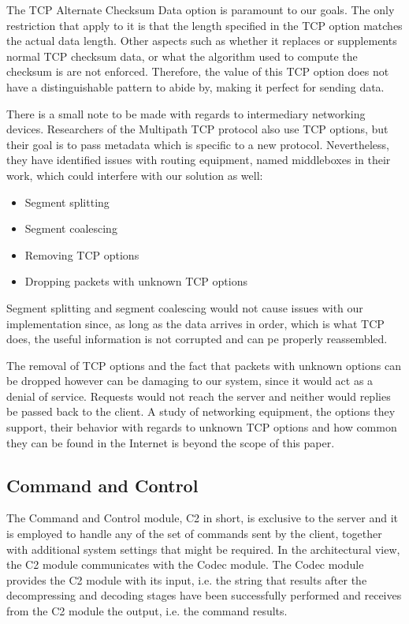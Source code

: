 The TCP Alternate Checksum Data option is paramount to our goals. The only
restriction that apply to it is that the length specified in the TCP option
matches the actual data length. Other aspects such as whether it replaces or
supplements normal TCP checksum data, or what the algorithm used to compute the
checksum is are not enforced. Therefore, the value of this TCP option does not
have a distinguishable pattern to abide by, making it perfect for sending data.

There is a small note to be made with regards to intermediary networking devices.
Researchers of the Multipath TCP protocol \cite{mptcp-how-hard} also use TCP options, but
their goal is to pass metadata which is specific to a new protocol. Nevertheless,
they have identified issues with routing equipment, named middleboxes in their work,
which could interfere with our solution as well:
\begin{itemize}
\item Segment splitting
\item Segment coalescing
\item Removing TCP options
\item Dropping packets with unknown TCP options
\end{itemize}

Segment splitting and segment coalescing would not cause issues with our implementation
since, as long as the data arrives in order, which is what TCP does, the useful
information is not corrupted and can pe properly reassembled.

The removal of TCP options and the fact that packets with unknown options can be
dropped however can be damaging to our system, since it would act as a denial of
service. Requests would not reach the server and neither would replies be passed
back to the client. A study of networking equipment, the options they support, their
behavior with regards to unknown TCP options and how common they can be found in
the Internet is beyond the scope of this paper.

\subsection{Command and Control}

The Command and Control module, C2 in short, is exclusive to the server and it is
employed to handle any of the set of commands sent by the client, together with additional
system settings that might be required. In the architectural view, the C2 module
communicates with the Codec module. The Codec module provides the C2 module with
its input, i.e. the string that results after the decompressing and decoding stages
have been successfully performed and receives from the C2 module the output, i.e.
the command results.
	
